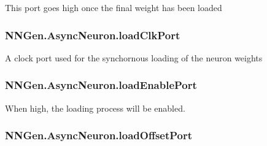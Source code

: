 This port goes high once the final weight has been loaded 

\hypertarget{class_n_n_gen_1_1_async_neuron_a374b98dccdbd95b77e6e64d896220a8b}{}
\subsubsection[{load\+Clk\+Port}]{ N\+N\+Gen.\+Async\+Neuron.\+load\+Clk\+Port\hspace{0.3cm}{\ttfamily [get]}}\label{class_n_n_gen_1_1_async_neuron_a374b98dccdbd95b77e6e64d896220a8b}


A clock port used for the synchornous loading of the neuron weights 

\hypertarget{class_n_n_gen_1_1_async_neuron_a83a3e6466b062e49a29ce46508e2bdf0}{}
\subsubsection[{load\+Enable\+Port}]{ N\+N\+Gen.\+Async\+Neuron.\+load\+Enable\+Port\hspace{0.3cm}{\ttfamily [get]}}\label{class_n_n_gen_1_1_async_neuron_a83a3e6466b062e49a29ce46508e2bdf0}


When high, the loading process will be enabled. 

\hypertarget{class_n_n_gen_1_1_async_neuron_a96074bc794e643df031319b43efb986c}{}
\subsubsection[{load\+Offset\+Port}]{ N\+N\+Gen.\+Async\+Neuron.\+load\+Offset\+Port\hspace{0.3cm}{\ttfamily [get]}}\label{class_n_n_gen_1_1_async_neuron_a96074bc794e643df031319b43efb986c}


